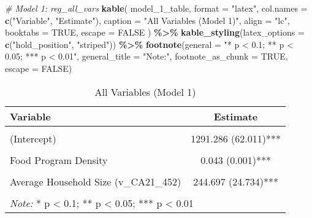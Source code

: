 \documentclass[
]{article}
\newenvironment{Shaded}{\begin{snugshade}}{\end{snugshade}}
\newcommand{\AttributeTok}[1]{\textcolor[rgb]{0.13,0.29,0.53}{#1}}
\newcommand{\CommentTok}[1]{\textcolor[rgb]{0.56,0.35,0.01}{\textit{#1}}}
\newcommand{\ConstantTok}[1]{\textcolor[rgb]{0.56,0.35,0.01}{#1}}
\newcommand{\FunctionTok}[1]{\textcolor[rgb]{0.13,0.29,0.53}{\textbf{#1}}}
\newcommand{\NormalTok}[1]{#1}
\newcommand{\SpecialCharTok}[1]{\textcolor[rgb]{0.81,0.36,0.00}{\textbf{#1}}}
\newcommand{\StringTok}[1]{\textcolor[rgb]{0.31,0.60,0.02}{#1}}
\begin{document}
\begin{Shaded}
\begin{Highlighting}[]
\CommentTok{\# Model 1: reg\_all\_vars}
\FunctionTok{kable}\NormalTok{(}
\NormalTok{  model\_1\_table,}
  \AttributeTok{format =} \StringTok{"latex"}\NormalTok{,}
  \AttributeTok{col.names =} \FunctionTok{c}\NormalTok{(}\StringTok{"Variable"}\NormalTok{, }\StringTok{"Estimate"}\NormalTok{),}
  \AttributeTok{caption =} \StringTok{"All Variables (Model 1)"}\NormalTok{,}
  \AttributeTok{align =} \StringTok{"lc"}\NormalTok{,}
  \AttributeTok{booktabs =} \ConstantTok{TRUE}\NormalTok{,}
  \AttributeTok{escape =} \ConstantTok{FALSE}
\NormalTok{) }\SpecialCharTok{\%\textgreater{}\%}
  \FunctionTok{kable\_styling}\NormalTok{(}\AttributeTok{latex\_options =} \FunctionTok{c}\NormalTok{(}\StringTok{"hold\_position"}\NormalTok{, }\StringTok{"striped"}\NormalTok{)) }\SpecialCharTok{\%\textgreater{}\%}
  \FunctionTok{footnote}\NormalTok{(}\AttributeTok{general =} \StringTok{"* p \textless{} 0.1; ** p \textless{} 0.05; *** p \textless{} 0.01"}\NormalTok{, }
           \AttributeTok{general\_title =} \StringTok{"Note:"}\NormalTok{, }
           \AttributeTok{footnote\_as\_chunk =} \ConstantTok{TRUE}\NormalTok{, }
           \AttributeTok{escape =} \ConstantTok{FALSE}\NormalTok{)}
\end{Highlighting}
\end{Shaded}

\begin{table}[!h]
\centering
\caption{\label{tab:unnamed-chunk-11}All Variables (Model 1)}
\centering
\begin{tabular}[t]{lc}
\toprule
Variable & Estimate\\
\midrule
\cellcolor{gray!10}{Spec 1: All Variables} & \cellcolor{gray!10}{}\\
(Intercept) & 1291.286 (62.011)***\\
\cellcolor{gray!10}{Food Program Density: Low Income} & \cellcolor{gray!10}{-0.203 (2.154)}\\
Food Program Density & 0.043 (0.001)***\\
\cellcolor{gray!10}{Population Density} & \cellcolor{gray!10}{-517.756 (22.439)***}\\
\addlinespace
Average Household Size (v\_CA21\_452) & 244.697 (24.734)***\\
\cellcolor{gray!10}{Low Income} & \cellcolor{gray!10}{9.460 (2.305)***}\\
\bottomrule
\multicolumn{2}{l}{\rule{0pt}{1em}\textit{Note:} * p < 0.1; ** p < 0.05; *** p < 0.01}\\
\end{tabular}
\end{table}
\end{document}
